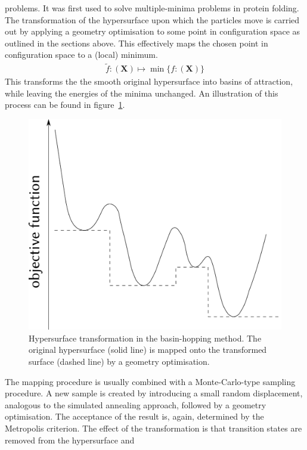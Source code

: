 problems.\autocite{Wales_GlobalOptimizationBasinHopping_1997,Doye_Structuralconsequencesrange_1997,Doye_Modelingstructureclusters_2001}
It was first used to solve multiple-minima problems in protein
folding.\autocite{Li_MonteCarlominimizationapproach_1987} The transformation of
the hypersurface upon which the particles move is carried out by applying a
geometry optimisation to some point in configuration space as outlined in the
sections above. This effectively maps the chosen point in configuration space to
a (local) minimum.
%
\begin{align}
    \widetilde{f} : (\mathbf{X}) \mapsto \min\{f : (\mathbf{X})\}
\end{align}
%
This transforms the the smooth original hypersurface into basins of attraction,
while leaving the energies of the minima unchanged. An illustration of this
process can be found in figure~\ref{fig:PEStransform}.
%
\begin{figure}[htb]\centering
    \includegraphics[width=.8\textwidth]{other-pics/basin-hopping.pdf}
    \caption{Hypersurface transformation in the basin-hopping method. The original hypersurface (solid line) is mapped onto the transformed surface (dashed line) by a geometry optimisation.}
    \label{fig:PEStransform}
\end{figure}
%
The mapping procedure is usually combined with a Monte-Carlo-type sampling
procedure.\autocite{Wales_GlobalOptimizationBasinHopping_1997} A new sample is
created by introducing a small random displacement, analogous to the simulated
annealing approach, followed by a geometry optimisation. The acceptance of the
result is, again, determined by the Metropolis criterion. The effect of the
transformation is that transition states are removed from the hypersurface and
